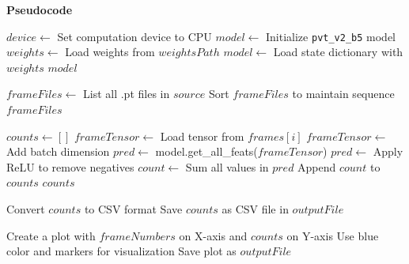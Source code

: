\documentclass[11pt]{report}
\begin{document}
\textbf{Pseudocode}  

\begin{algorithm}[H]
\caption{Load Pretrained Model}
\begin{algorithmic}[1]
    \State $device \gets$ Set computation device to CPU
    \State $model \gets$ Initialize \texttt{pvt\_v2\_b5} model
    \State $weights \gets$ Load weights from $weightsPath$
    \State $model \gets$ Load state dictionary with $weights$
    \State \Return $model$
\EndFunction
\end{algorithmic}
\end{algorithm}

\begin{algorithm}[H]
\caption{Load Preprocessed Frames}
\begin{algorithmic}[1]
    \State $frameFiles \gets$ List all .pt files in $source$
    \State Sort $frameFiles$ to maintain sequence
    \State \Return $frameFiles$
\EndFunction
\end{algorithmic}
\end{algorithm}

\begin{algorithm}[H]
\caption{Predict Crowd Counts}
\begin{algorithmic}[1]
    \State $counts \gets []$
        \State $frameTensor \gets$ Load tensor from $frames[i]$
        \State $frameTensor \gets$ Add batch dimension
        \State $pred \gets$ model.get\_all\_feats($frameTensor$)
        \State $pred \gets$ Apply ReLU to remove negatives
        \State $count \gets$ Sum all values in $pred$
        \State Append $count$ to $counts$
    \EndFor
    \State \Return $counts$
\EndFunction
\end{algorithmic}
\end{algorithm}

\begin{algorithm}[H]
\caption{Save Crowd Density Data}
\begin{algorithmic}[1]
    \State Convert $counts$ to CSV format
    \State Save $counts$ as CSV file in $outputFile$
\EndFunction
\end{algorithmic}
\end{algorithm}

\begin{algorithm}[H]
\caption{Plot Crowd Density Trends}
\begin{algorithmic}[1]
    \State Create a plot with $frameNumbers$ on X-axis and $counts$ on Y-axis
    \State Use blue color and markers for visualization
    \State Save plot as $outputFile$
\EndFunction
\end{algorithmic}
\end{algorithm}
\end{document}
